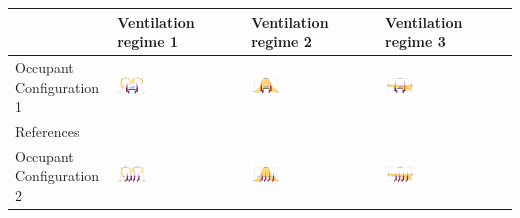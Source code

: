\documentclass[preprint,12pt]{elsarticle}
\begin{document}
\begin{table}[h!]
    \centering
    \begin{tabular}{|m{2.5cm}|m{3.5cm}|m{3.5cm}|m{3.5cm}|}
    \hline
     & Ventilation regime 1 & Ventilation regime 2 & Ventilation regime 3 \\
    \hline
    Occupant Configuration 1 & \includegraphics[clip,trim={0 2cm 0 2cm},width=0.25\textwidth]{Airflow/mat1.jpeg}& \includegraphics[clip,trim={0 2cm 0 2cm},width=0.25\textwidth]{Airflow/mat4.jpeg}& \includegraphics[clip,trim={0 2cm 0 2cm},width=0.25\textwidth]{Airflow/mat7.jpeg} \\
    \hline
    References & \cite{li2020investigating,zhou2021experimental,pan2022boundary,pan2023predicting,li2022airborne} & \cite{deng2021control,zhou2021experimental,wu2023numerical} & \cite{pendar2020numerical,feng2020influence} \\
    \hline
    Occupant Configuration 2 &\includegraphics[clip,trim={0 2cm 0 2cm},width=0.25\textwidth]{Airflow/mat2.jpeg}& \includegraphics[clip,trim={0 2cm 0 2cm},width=0.25\textwidth]{Airflow/mat5.jpeg}& \includegraphics[clip,trim={0 2cm 0 2cm},width=0.25\textwidth]{Airflow/mat8.jpeg} \\

\end{tabular}
\end{table}
\end{document}
